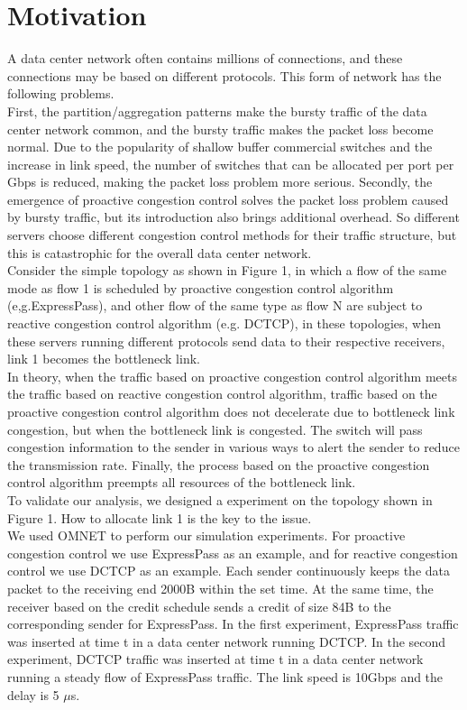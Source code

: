 \documentclass[conference]{IEEEtran}
\begin{document}
\section{Motivation}

A data center network often contains millions of connections\cite{Alizadeh2010Data}, and these connections may be based on different protocols. This form of network has the following problems.\\
\indent First, the partition/aggregation patterns\cite{Alizadeh2010Data} make the bursty traffic\cite{benson2010network} of the data center network common, and the bursty traffic makes the packet loss become normal. Due to the popularity of shallow buffer commercial switches and the increase in link speed, the number of switches that can be allocated per port per Gbps is reduced, making the packet loss problem more serious. Secondly, the emergence of proactive congestion control solves the packet loss problem caused by bursty traffic, but its introduction also brings additional overhead. So different servers choose different congestion control methods for their traffic structure, but this is catastrophic for the overall data center network.\\
\indent Consider the simple topology as shown in Figure 1, in which a flow of the same mode as flow 1 is scheduled by proactive congestion control algorithm (e,g.ExpressPass\cite{cho2017credit}), and other flow of the same type as flow N are subject to reactive congestion control algorithm (e.g. DCTCP\cite{Alizadeh2010Data}), in these topologies, when these servers running different protocols send data to their respective receivers, link 1 becomes the bottleneck link.\\
\indent In theory, when the traffic based on proactive congestion control algorithm meets the traffic based on reactive congestion control algorithm, traffic based on the proactive congestion control algorithm does not decelerate due to bottleneck link congestion, but when the bottleneck link is congested.  The switch will pass congestion information to the sender in various ways to alert the sender to reduce the transmission rate. Finally, the process based on the proactive congestion control algorithm preempts all resources of the bottleneck link.\\
\indent To validate our analysis, we designed a experiment on the topology shown in Figure 1. How to allocate link 1 is the key to the issue.\\
\indent We used OMNET\cite{pongor1993omnet} to perform our simulation experiments. For proactive congestion control we use ExpressPass\cite{cho2017credit} as an example, and for reactive congestion control we use DCTCP\cite{Alizadeh2010Data} as an example. Each sender continuously keeps the data packet to the receiving end 2000B within the set time. At the same time, the receiver based on the credit schedule sends a credit of size 84B to the corresponding sender for ExpressPass. In the first experiment, ExpressPass traffic was inserted at time t in a data center network running DCTCP. In the second experiment, DCTCP traffic was inserted at time t in a data center network running a steady flow of ExpressPass traffic.     The link speed is 10Gbps and the delay is 5 $\mu$s.\\
\end{document}
